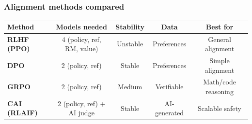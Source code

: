 \documentclass[aspectratio=169]{beamer}
\begin{document}
\begin{frame}
\frametitle{Alignment methods compared}

\vspace{-0.1cm}
\renewcommand{\arraystretch}{1.5}
\begin{center}
{\small
\begin{tabular}{>{\bfseries}l c c c c}
  \textbf{Method} & \textbf{Models needed} & \textbf{Stability} & \textbf{Data} & \textbf{Best for} \\
  \hline
  \textcolor{sampred}{RLHF (PPO)} & 4 (policy, ref, RM, value) & Unstable & Preferences & General alignment \\[3pt]
  \textcolor{paramgreen}{DPO} & 2 (policy, ref) & Stable & Preferences & Simple alignment \\[3pt]
  \textcolor{orange1}{GRPO} & 2 (policy, ref) & Medium & Verifiable & Math/code reasoning \\[3pt]
  \textcolor{violet1}{CAI (RLAIF)} & 2 (policy, ref) + AI judge & Stable & AI-generated & Scalable safety \\
  \hline
\end{tabular}
}
\end{center}

\vspace{0.4cm}
\begin{center}
\end{center}
\end{frame}
\end{document}
